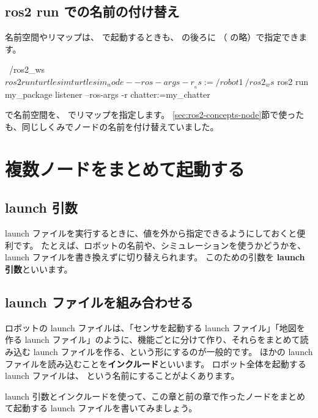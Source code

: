 \subsection{ros2 run での名前の付け替え}

名前空間やリマップは、 で起動するときも、 の後ろに （ の略）で指定できます。

\begin{terminal}
~/ros2_ws$ ros2 run turtlesim turtlesim_node --ros-args -r __ns:=/robot1
~/ros2_ws$ ros2 run my_package listener --ros-args -r chatter:=my_chatter
\end{terminal}

 で名前空間を、 でリマップを指定します。
\ref{sec:ros2-concepts-node}節で使った  も、同じしくみでノードの名前を付け替えていました。

\section{複数ノードをまとめて起動する}
\label{sec:launch-bringup}

\subsection{launch 引数}

launch ファイルを実行するときに、値を外から指定できるようにしておくと便利です。
たとえば、ロボットの名前や、シミュレーションを使うかどうかを、launch ファイルを書き換えずに切り替えられます。
このための引数を \textbf{launch 引数}といいます。

\subsection{launch ファイルを組み合わせる}

ロボットの launch ファイルは、「センサを起動する launch ファイル」「地図を作る launch ファイル」のように、機能ごとに分けて作り、それらをまとめて読み込む launch ファイルを作る、という形にするのが一般的です。
ほかの launch ファイルを読み込むことを\textbf{インクルード}といいます。
ロボット全体を起動する launch ファイルは、 という名前にすることがよくあります。

launch 引数とインクルードを使って、この章と前の章で作ったノードをまとめて起動する launch ファイルを書いてみましょう。


